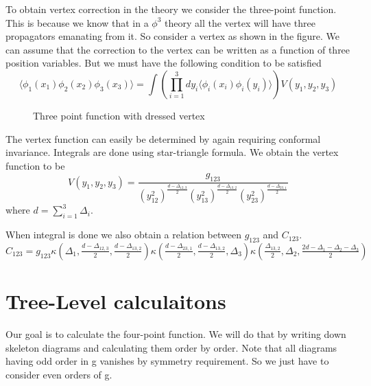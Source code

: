 \documentclass[12pt,a4paper,oneside]{book}
\theoremstyle{definition}
\begin{document}
    To obtain vertex correction in the theory we consider the three-point function. This is because we know that in a $\phi^{3}$ theory all the vertex will have three propagators emanating from it. So consider a vertex as shown in the figure. We can assume that the correction to the vertex can be written as a function of three position variables. But we must have the following condition to be satisfied
    \begin{equation}
        \langle \phi_1(x_1)\phi_2(x_2)\phi_3(x_3) \rangle = \int \left(\prod_{i=1}^{3}dy_i\langle\phi_i(x_i)\phi_i(y_i)\rangle \right)V(y_1,y_2,y_3)
    \end{equation}
    \begin{figure}
        \caption{Three point function with dressed vertex}\label{fig:vertex}
    \end{figure}
    The vertex function can easily be determined by again requiring conformal invariance. Integrals are done using star-triangle formula. We obtain the vertex function to be
    \begin{equation}
        V(y_1,y_2,y_3) = \frac{g_{123}}{(y_{12}^2)^{\frac{d-\Delta_{12,3}}{2}}(y_{13}^2)^{\frac{d-\Delta_{13,2}}{2}}(y_{23}^2)^{\frac{d-\Delta_{23,1}}{2}}}
    \end{equation}
    where $d = \sum_{i=1}^3 \Delta_i$.\par
    When integral is done we also obtain a relation between $g_{123}$ and $C_{123}$.
    \footnotesize
    \begin{equation}
        C_{123} = g_{123}\kappa\left(\Delta_1,\tfrac{d-\Delta_{12,3}}{2},\tfrac{d-\Delta_{13,2}}{2} \right)\kappa\left(\tfrac{d-\Delta_{23,1}}{2},\tfrac{d-\Delta_{13,2}}{2},\Delta_3 \right)\kappa\left(\tfrac{\Delta_{13,2}}{2},\Delta_2,\tfrac{2d-\Delta_1-\Delta_2-\Delta_3}{2} \right)
    \end{equation}
    \normalsize
    \section{Tree-Level calculaitons}
    Our goal is to calculate the four-point function. We will do that by writing down skeleton diagrams and calculating them order by order. Note that all diagrams having odd order in g vanishes by symmetry requirement. So we just have to consider even orders of g.
\end{document}
